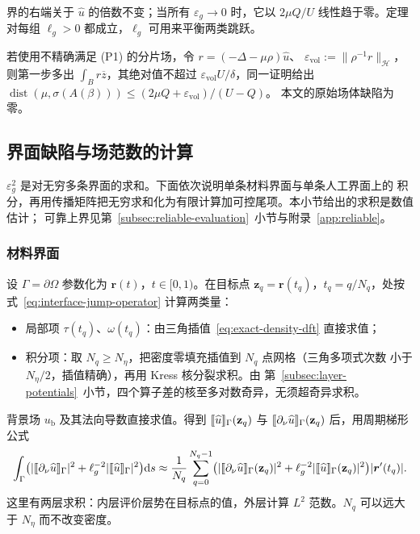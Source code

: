 界的右端关于 $\widehat u$ 的倍数不变；当所有 $\varepsilon_g\to0$ 时，它以 $2\mu Q/U$
线性趋于零。定理对每组 $\ell_g>0$ 都成立，$\ell_g$ 可用来平衡两类跳跃。


\begin{remark}[体缺陷]
  若使用不精确满足 (P1) 的分片场，令 $r=(-\Delta-\mu\rho)\widehat u$、
  $\varepsilon_{\mathrm{vol}}:=\lVert\rho^{-1}r\rVert_{\mathcal H}$，则第一步多出
  $\int_Br\overline z$，其绝对值不超过 $\varepsilon_{\mathrm{vol}}U/\delta$，同一证明给出
  $\operatorname{dist}(\mu,\sigma(A(\beta)))\leq(2\mu Q+\varepsilon_{\mathrm{vol}})/(U-Q)$。
  本文的原始场体缺陷为零。
\end{remark}

\subsection{界面缺陷与场范数的计算}
\label{subsec:computation}

$\varepsilon_g^2$ 是对无穷多条界面的求和。下面依次说明单条材料界面与单条人工界面上的
积分，再用传播矩阵把无穷求和化为有限计算加可控尾项。本小节给出的求积是数值估计；
可靠上界见第~\ref{subsec:reliable-evaluation}~小节与附录~\ref{app:reliable}。


\subsubsection{材料界面}

设 $\Gamma=\partial\Omega$ 参数化为 $\boldsymbol r(t)$，$t\in[0,1)$。在目标点
$\mathbf z_q=\boldsymbol r(t_q)$，$t_q=q/N_q$，处按式~\eqref{eq:interface-jump-operator}
计算两类量：
\begin{itemize}
  \item 局部项 $\tau(t_q)$、$\omega(t_q)$：由三角插值~\eqref{eq:exact-density-dft}
    直接求值；
  \item 积分项：取 $N_q\geq N_\eta$，把密度零填充插值到 $N_q$ 点网格（三角多项式次数
    小于 $N_\eta/2$，插值精确），再用 Kress 核分裂求积。由
    第~\ref{subsec:layer-potentials}~小节，四个算子差的核至多对数奇异，无须超奇异求积。
\end{itemize}
背景场 $u_{\mathrm b}$ 及其法向导数直接求值。得到 $\llbracket \widehat u\rrbracket_\Gamma(\mathbf z_q)$
与 $\llbracket \partial_\nu\widehat u\rrbracket_\Gamma(\mathbf z_q)$ 后，用周期梯形公式
\begin{align}
  \int_\Gamma\bigl(|\llbracket \partial_\nu\widehat u\rrbracket_\Gamma|^2
    +\ell_g^{-2}|\llbracket \widehat u\rrbracket_\Gamma|^2\bigr)\mathrm{d} s
  \approx\frac1{N_q}\sum_{q=0}^{N_q-1}
  \bigl(|\llbracket \partial_\nu\widehat u\rrbracket_\Gamma(\mathbf z_q)|^2
    +\ell_g^{-2}|\llbracket \widehat u\rrbracket_\Gamma(\mathbf z_q)|^2\bigr)|\boldsymbol r'(t_q)|.
  \label{eq:material-jump-quadrature}
\end{align}
这里有两层求积：内层评价层势在目标点的值，外层计算 $L^2$ 范数。$N_q$ 可以远大于
$N_\eta$ 而不改变密度。


